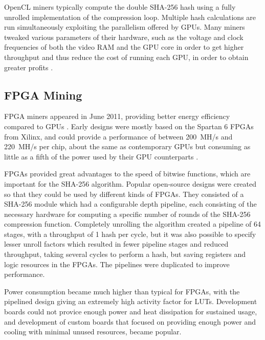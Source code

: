 OpenCL miners typically compute the double SHA-256 hash using a fully unrolled implementation
of the compression loop. Multiple hash calculations are run simultaneously exploiting the parallelism
offered by GPUs. Many miners tweaked various parameters of their hardware, such as the voltage and
clock frequencies of both the video RAM and the GPU core in order to get higher throughput
and thus reduce the cost of running each GPU, in order to obtain greater profits \cite{bespoke-silicon}.

\subsection{FPGA Mining}
\label{sec:fpga-mining}

FPGA miners appeared in June 2011, providing better energy efficiency compared to GPUs \cite{bespoke-silicon}.
Early designs were mostly based on the Spartan 6 FPGAs from Xilinx, and could provide a
performance of between 200~MH/s and 220~MH/s per chip, about the same as contemporary GPUs \cite{bitcoin-hardware-cmp}
but consuming as little as a fifth of the power used by their GPU counterparts \cite{bespoke-silicon}.


FPGAs provided great advantages to the speed of bitwise functions, which are important for
the SHA-256 algorithm. Popular open-source designs were created so that they could be used
by different kinds of FPGAs. They consisted of a SHA-256 module which had a configurable depth pipeline, each
consisting of the necessary hardware for computing a specific number of rounds of the
SHA-256 compression function. Completely unrolling the algorithm created a pipeline of
64 stages, with a throughput of 1 hash per cycle, but it was also possible to specify
lesser unroll factors which resulted in fewer pipeline stages and reduced throughput, taking
several cycles to perform a hash, but saving registers and logic resources in the FPGAs.
The pipelines were duplicated to improve performance.

Power consumption became much higher than typical for FPGAs, with the pipelined design
giving an extremely high activity factor for LUTs. Development boards could not provice enough
power and heat dissipation for sustained usage, and development of custom boards that focused
on providing enough power and cooling with minimal unused resources, became popular. \cite{bespoke-silicon}


